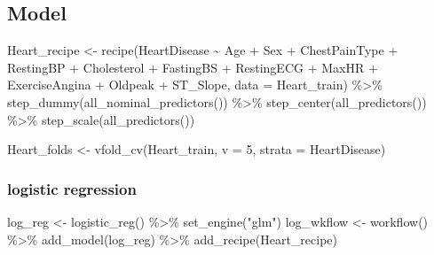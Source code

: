 \documentclass[
]{article}
\newenvironment{Shaded}{\begin{snugshade}}{\end{snugshade}}
\newcommand{\AttributeTok}[1]{\textcolor[rgb]{0.77,0.63,0.00}{#1}}
\newcommand{\DecValTok}[1]{\textcolor[rgb]{0.00,0.00,0.81}{#1}}
\newcommand{\FunctionTok}[1]{\textcolor[rgb]{0.00,0.00,0.00}{#1}}
\newcommand{\NormalTok}[1]{#1}
\newcommand{\OtherTok}[1]{\textcolor[rgb]{0.56,0.35,0.01}{#1}}
\newcommand{\SpecialCharTok}[1]{\textcolor[rgb]{0.00,0.00,0.00}{#1}}
\newcommand{\StringTok}[1]{\textcolor[rgb]{0.31,0.60,0.02}{#1}}
\begin{document}
\hypertarget{model}{%
\subsection{Model}\label{model}}

\begin{Shaded}
\begin{Highlighting}[]
\NormalTok{Heart\_recipe }\OtherTok{\textless{}{-}} \FunctionTok{recipe}\NormalTok{(HeartDisease }\SpecialCharTok{\textasciitilde{}}\NormalTok{ Age }\SpecialCharTok{+}\NormalTok{ Sex }\SpecialCharTok{+}\NormalTok{ ChestPainType }\SpecialCharTok{+}
\NormalTok{                       RestingBP }\SpecialCharTok{+}\NormalTok{ Cholesterol }\SpecialCharTok{+}\NormalTok{ FastingBS }\SpecialCharTok{+}\NormalTok{ RestingECG }\SpecialCharTok{+}\NormalTok{ MaxHR }\SpecialCharTok{+}\NormalTok{ ExerciseAngina }\SpecialCharTok{+}\NormalTok{ Oldpeak }\SpecialCharTok{+}\NormalTok{ ST\_Slope,                               }\AttributeTok{data =}\NormalTok{ Heart\_train) }\SpecialCharTok{\%\textgreater{}\%}
  \FunctionTok{step\_dummy}\NormalTok{(}\FunctionTok{all\_nominal\_predictors}\NormalTok{()) }\SpecialCharTok{\%\textgreater{}\%}
  \FunctionTok{step\_center}\NormalTok{(}\FunctionTok{all\_predictors}\NormalTok{()) }\SpecialCharTok{\%\textgreater{}\%} 
  \FunctionTok{step\_scale}\NormalTok{(}\FunctionTok{all\_predictors}\NormalTok{())}
\end{Highlighting}
\end{Shaded}

\begin{Shaded}
\begin{Highlighting}[]
\NormalTok{Heart\_folds }\OtherTok{\textless{}{-}} \FunctionTok{vfold\_cv}\NormalTok{(Heart\_train, }\AttributeTok{v =} \DecValTok{5}\NormalTok{, }\AttributeTok{strata =}\NormalTok{ HeartDisease)}
\end{Highlighting}
\end{Shaded}

\hypertarget{logistic-regression}{%
\subsubsection{logistic regression}\label{logistic-regression}}

\begin{Shaded}
\begin{Highlighting}[]
\NormalTok{log\_reg }\OtherTok{\textless{}{-}} \FunctionTok{logistic\_reg}\NormalTok{() }\SpecialCharTok{\%\textgreater{}\%}
  \FunctionTok{set\_engine}\NormalTok{(}\StringTok{"glm"}\NormalTok{)}
\NormalTok{log\_wkflow }\OtherTok{\textless{}{-}} \FunctionTok{workflow}\NormalTok{() }\SpecialCharTok{\%\textgreater{}\%}
  \FunctionTok{add\_model}\NormalTok{(log\_reg) }\SpecialCharTok{\%\textgreater{}\%}
  \FunctionTok{add\_recipe}\NormalTok{(Heart\_recipe)}
\end{Highlighting}
\end{Shaded}
\end{document}
